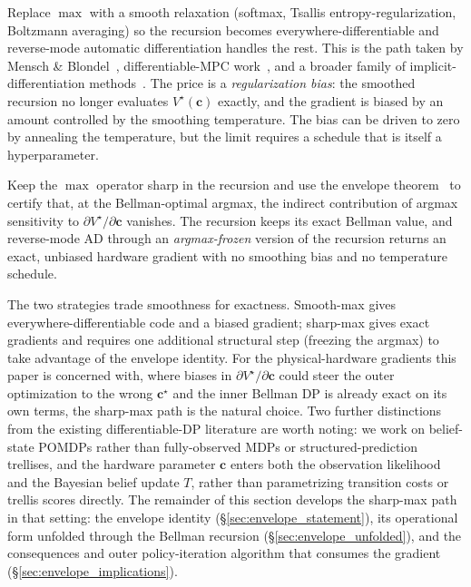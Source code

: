 \documentclass[11pt,a4paper,onecolumn]{article}
\newcommand{\bc}{\bm{c}}
\begin{document}
\begin{description}[nosep, leftmargin=2em]
\item[Smooth-max (the dominant approach).] Replace $\max$ with a smooth relaxation (softmax, Tsallis entropy-regularization, Boltzmann averaging) so the recursion becomes everywhere-differentiable and reverse-mode automatic differentiation handles the rest.  This is the path taken by Mensch \& Blondel~\cite{mensch2018differentiable}, differentiable-MPC work~\cite{amos2018mpc}, and a broader family of implicit-differentiation methods~\cite{domke2012generic, blondel2022efficient}.  The price is a \emph{regularization bias}: the smoothed recursion no longer evaluates $V^\star(\bc)$ exactly, and the gradient is biased by an amount controlled by the smoothing temperature.  The bias can be driven to zero by annealing the temperature, but the limit requires a schedule that is itself a hyperparameter.
\item[Sharp-max via envelope (the approach of this paper).] Keep the $\max$ operator sharp in the recursion and use the envelope theorem~\cite{milgrom2002envelope, danskin1966theory, benveniste1979differentiability, bonnans2000perturbation} to certify that, at the Bellman-optimal argmax, the indirect contribution of argmax sensitivity to $\partial V^\star / \partial \bc$ vanishes.  The recursion keeps its exact Bellman value, and reverse-mode AD through an \emph{argmax-frozen} version of the recursion returns an exact, unbiased hardware gradient with no smoothing bias and no temperature schedule.
\end{description}

The two strategies trade smoothness for exactness.  Smooth-max gives everywhere-differentiable code and a biased gradient; sharp-max gives exact gradients and requires one additional structural step (freezing the argmax) to take advantage of the envelope identity.  For the physical-hardware gradients this paper is concerned with, where biases in $\partial V^\star / \partial \bc$ could steer the outer optimization to the wrong $\bc^\star$ and the inner Bellman DP is already exact on its own terms, the sharp-max path is the natural choice.  Two further distinctions from the existing differentiable-DP literature are worth noting: we work on belief-state POMDPs rather than fully-observed MDPs or structured-prediction trellises, and the hardware parameter $\bc$ enters both the observation likelihood and the Bayesian belief update $T$, rather than parametrizing transition costs or trellis scores directly.  The remainder of this section develops the sharp-max path in that setting: the envelope identity (§\ref{sec:envelope_statement}), its operational form unfolded through the Bellman recursion (§\ref{sec:envelope_unfolded}), and the consequences and outer policy-iteration algorithm that consumes the gradient (§\ref{sec:envelope_implications}).
\end{document}
